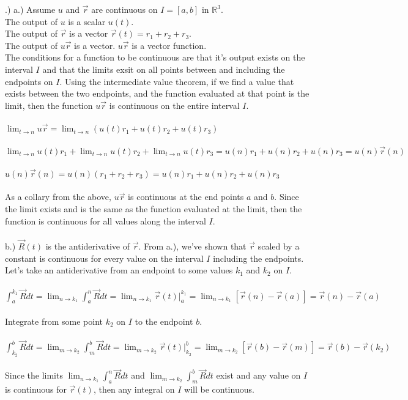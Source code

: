 \documentclass[12pt]{article}
\begin{document}
.)
\noindent a.) Assume $u$ and $\vec{r}$ are continuous on $I = [a,b]$ in $\mathbb{R}^{3}$.\\
\noindent The output of $u$ is a scalar $u(t)$.\\
\noindent The output of $\vec{r}$ is a vector $\vec{r}(t) = r_{1} + r_{2} + r_{3}$.\\
\noindent The output of $u\vec{r}$ is a vector. $u\vec{r}$ is a vector function.\\
\noindent The conditions for a function to be continuous are that it's output exists on the interval $I$ and that the 
limits exsit on all points between and including the endpoints on $I$. Using the intermediate value theorem, if we 
find a value that exists between the two endpoints, and the function evaluated at that point is the limit, 
 then the function $u\vec{r}$ is continuous on the entire interval $I$.\\\\
\noindent $\lim_{t \to n}u\vec{r} = \lim_{t \to n}(u(t)r_{1} + u(t)r_{2} + u(t)r_{3})$\\\\
\noindent $\lim_{t \to n} u(t)r_{1} + \lim_{t \to n} u(t)r_{2} + \lim_{t \to n }u(t)r_{3}  = u(n)r_{1} + u(n)r_{2} + u(n)r_{3} = u(n)\vec{r}(n)$\\\\
\noindent $u(n)\vec{r}(n) = u(n)(r_{1} + r_{2} + r_{3})= u(n)r_{1} + u(n)r_{2} + u(n)r_{3}$\\\\
\noindent As a collary from the above, $u\vec{r}$ is continuous at the end points $a$ and $b$. Since the limit exists and is the same as the function evaluated at the limit, then the function is continuous
for all values along the interval $I$.\\\\

\noindent b.) $\vec{R}(t)$ is the antiderivative of $\vec{r}$. From a.), we've shown that $\vec{r}$ scaled by a constant is 
continuous for every value on the interval $I$ including the endpoints. Let's take an antiderivative from 
an endpoint to some values $k_{1}$ and $k_{2}$ on $I$.\\\\
\noindent $\int_{a}^{k_{1}}\vec{R}dt = \lim_{n \to k_{1}} \int_{a}^{n} \vec{R}dt = \lim_{n \to k_{1}} \vec{r}(t) \Big|_a^{k_{1}} = \lim_{n \to k_{1}}[\vec{r}(n) - \vec{r}(a)] = \vec{r}(n) - \vec{r}(a)$\\\\
\noindent Integrate from some point $k_{2}$ on $I$ to the endpoint $b$.\\\\
\noindent $\int_{k_{2}}^{b}\vec{R}dt = \lim_{m \to k_{2}} \int_{m}^{b} \vec{R}dt = \lim_{m \to k_{2}} \vec{r}(t) \Big|_{k_{2}}^b = \lim_{m \to k_{2}}[\vec{r}(b) - \vec{r}(m)] = \vec{r}(b) - \vec{r}(k_{2})$\\\\
\noindent Since the limits $\lim_{n \to k_{1}} \int_{a}^{n} \vec{R}dt$ and $\lim_{m \to k_{2}} \int_{m}^{b} \vec{R}dt$ exist 
and any value on $I$ is continuous for $\vec{r}(t)$, then any integral on $I$ will be continuous.\\\\ 
\end{document}
